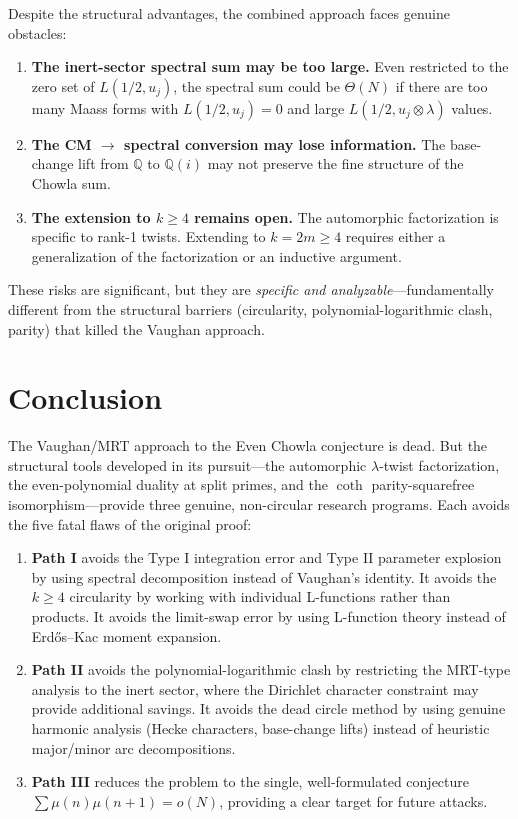 \documentclass[11pt,a4paper]{article}
\theoremstyle{definition}
\begin{document}
Despite the structural advantages, the combined approach faces genuine obstacles:

\begin{enumerate}
\item \textbf{The inert-sector spectral sum may be too large.} Even restricted to the zero set of $L(1/2, u_j)$, the spectral sum could be $\Theta(N)$ if there are too many Maass forms with $L(1/2, u_j) = 0$ and large $L(1/2, u_j \otimes \lambda)$ values.

\item \textbf{The CM $\to$ spectral conversion may lose information.} The base-change lift from $\mathbb{Q}$ to $\mathbb{Q}(i)$ may not preserve the fine structure of the Chowla sum.

\item \textbf{The extension to $k \ge 4$ remains open.} The automorphic factorization is specific to rank-1 twists. Extending to $k = 2m \ge 4$ requires either a generalization of the factorization or an inductive argument.
\end{enumerate}

These risks are significant, but they are \emph{specific and analyzable}---fundamentally different from the structural barriers (circularity, polynomial-logarithmic clash, parity) that killed the Vaughan approach.

\section{Conclusion}

The Vaughan/MRT approach to the Even Chowla conjecture is dead. But the structural tools developed in its pursuit---the automorphic $\lambda$-twist factorization, the even-polynomial duality at split primes, and the $\coth$ parity-squarefree isomorphism---provide three genuine, non-circular research programs. Each avoids the five fatal flaws of the original proof:

\begin{enumerate}
\item \textbf{Path I} avoids the Type I integration error and Type II parameter explosion by using spectral decomposition instead of Vaughan's identity. It avoids the $k \ge 4$ circularity by working with individual L-functions rather than products. It avoids the limit-swap error by using L-function theory instead of Erd\H{o}s--Kac moment expansion.

\item \textbf{Path II} avoids the polynomial-logarithmic clash by restricting the MRT-type analysis to the inert sector, where the Dirichlet character constraint may provide additional savings. It avoids the dead circle method by using genuine harmonic analysis (Hecke characters, base-change lifts) instead of heuristic major/minor arc decompositions.

\item \textbf{Path III} reduces the problem to the single, well-formulated conjecture $\sum \mu(n)\mu(n+1) = o(N)$, providing a clear target for future attacks.
\end{enumerate}
\end{document}
